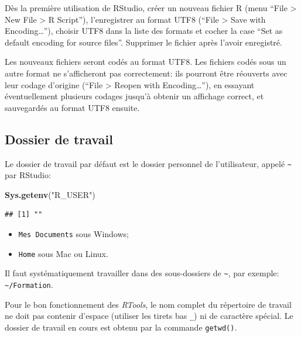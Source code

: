 \documentclass[
  12pt,
  french,
  a4paper,
  extrafontsizes,onecolumn,openright
  ]{memoir}
\newenvironment{Shaded}{\begin{snugshade}}{\end{snugshade}}
\newcommand{\FunctionTok}[1]{\textcolor[rgb]{0.13,0.29,0.53}{\textbf{#1}}}
\newcommand{\NormalTok}[1]{#1}
\newcommand{\StringTok}[1]{\textcolor[rgb]{0.31,0.60,0.02}{#1}}
\providecommand{\tightlist}{%
  \setlength{\itemsep}{0pt}\setlength{\parskip}{0pt}}
\begin{document}
Dès la première utilisation de RStudio, créer un nouveau fichier R (menu \enquote{File \textgreater{} New File \textgreater{} R Script}), l'enregistrer au format UTF8 (\enquote{File \textgreater{} Save with Encoding\ldots{}}), choisir UTF8 dans la liste des formats et cocher la case \enquote{Set as default encoding for source files}.
Supprimer le fichier après l'avoir enregistré.

Les nouveaux fichiers seront codés au format UTF8.
Les fichiers codés sous un autre format ne s'afficheront pas correctement: ils pourront être réouverts avec leur codage d'origine (\enquote{File \textgreater{} Reopen with Encoding\ldots{}}), en essayant éventuellement plusieurs codages jusqu'à obtenir un affichage correct, et sauvegardés au format UTF8 ensuite.

\subsection{Dossier de travail}\label{dossier-de-travail}

Le dossier de travail par défaut est le dossier personnel de l'utilisateur, appelé \texttt{\textasciitilde{}} par RStudio:

\scriptsize

\begin{Shaded}
\begin{Highlighting}[]
\FunctionTok{Sys.getenv}\NormalTok{(}\StringTok{"R\_USER"}\NormalTok{)}
\end{Highlighting}
\end{Shaded}

\begin{verbatim}
## [1] ""
\end{verbatim}

\normalsize

\begin{itemize}
\tightlist
\item
  \texttt{Mes\ Documents} sous Windows;
\item
  \texttt{Home} sous Mac ou Linux.
\end{itemize}

Il faut systématiquement travailler dans des sous-dossiers de \texttt{\textasciitilde{}}, par exemple: \texttt{\textasciitilde{}/Formation}.

Pour le bon fonctionnement des \emph{RTools}, le nom complet du répertoire de travail ne doit pas contenir d'espace (utiliser les tirets bas \texttt{\_}) ni de caractère spécial.
Le dossier de travail en cours est obtenu par la commande \texttt{getwd()}.
\end{document}
